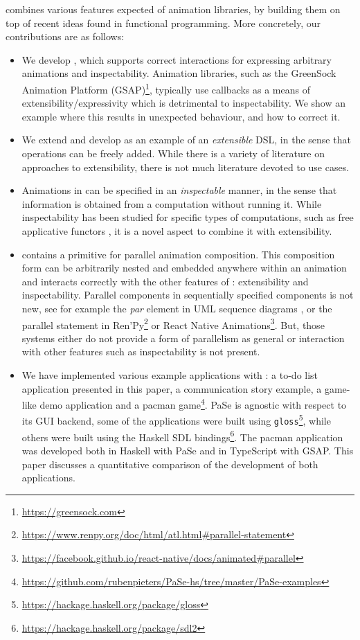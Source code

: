\dsl{} combines various features expected of animation libraries, by building them on top of recent ideas found in functional programming. More concretely, our contributions are as follows:
\begin{itemize}
\item We develop \dsl{}, which supports correct interactions for expressing arbitrary animations and inspectability. Animation libraries, such as the GreenSock Animation Platform (GSAP)\footnote{\url{https://greensock.com}}, typically use callbacks as a means of extensibility/expressivity which is detrimental to inspectability. We show an example where this results in unexpected behaviour, and how to correct it.
\item We extend and develop \dsl{} as an example of an \emph{extensible} DSL, in the sense that operations can be freely added. While there is a variety of literature on approaches to extensibility, there is not much literature devoted to use cases.
\item Animations in \dsl{} can be specified in an \emph{inspectable} manner, in the sense that information is obtained from a computation without running it. While inspectability has been studied for specific types of computations, such as free applicative functors \cite{DBLP:journals/corr/CapriottiK14}, it is a novel aspect to combine it with extensibility.
\item \dsl{} contains a primitive for parallel animation composition. This composition form can be arbitrarily nested and embedded anywhere within an animation and interacts correctly with the other features of \dsl{}: extensibility and inspectability. Parallel components in sequentially specified components is not new, see for example the \emph{par} element in UML sequence diagrams \cite{umlspec}, or the parallel statement in Ren'Py\footnote{\url{https://www.renpy.org/doc/html/atl.html\#parallel-statement}} or React Native Animations\footnote{\url{https://facebook.github.io/react-native/docs/animated\#parallel}}. But, those systems either do not provide a form of parallelism as general or interaction with other features such as inspectability is not present.
\item We have implemented various example applications with \dsl{}: a to-do list application presented in this paper, a communication story example, a game-like demo application and a pacman game\footnote{\url{https://github.com/rubenpieters/PaSe-hs/tree/master/PaSe-examples}}. PaSe is agnostic with respect to its GUI backend, some of the applications were built using \texttt{gloss}\footnote{\url{https://hackage.haskell.org/package/gloss}}, while others were built using the Haskell SDL bindings\footnote{\url{https://hackage.haskell.org/package/sdl2}}. The pacman application was developed both in Haskell with PaSe and in TypeScript with GSAP. This paper discusses a quantitative comparison of the development of both applications.
\end{itemize}
